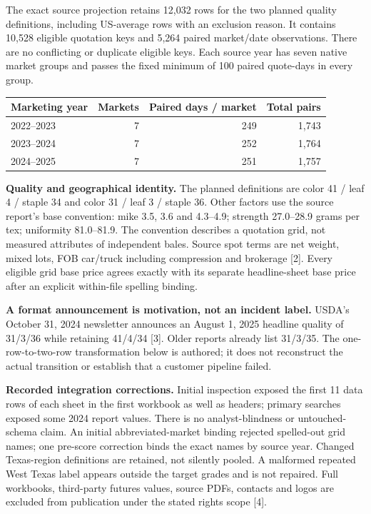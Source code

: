 \documentclass[10pt,letterpaper]{article}
\begin{document}
The exact source projection retains 12,032 rows for the two planned quality definitions, including US-average rows with an exclusion reason. It contains 10,528 eligible quotation keys and 5,264 paired market/date observations. There are no conflicting or duplicate eligible keys. Each source year has seven native market groups and passes the fixed minimum of 100 paired quote-days in every group.

\begin{center}\begin{tabular}{lrrr}\toprule
Marketing year & Markets & Paired days / market & Total pairs\\\midrule
2022--2023 & 7 & 249 & 1,743 \\
2023--2024 & 7 & 252 & 1,764 \\
2024--2025 & 7 & 251 & 1,757 \\
\bottomrule\end{tabular}\end{center}

\textbf{Quality and geographical identity.} The planned definitions are color 41 / leaf 4 / staple 34 and color 31 / leaf 3 / staple 36. Other factors use the source report's base convention: mike 3.5, 3.6 and 4.3--4.9; strength 27.0--28.9 grams per tex; uniformity 81.0--81.9. The convention describes a quotation grid, not measured attributes of independent bales. Source spot terms are net weight, mixed lots, FOB car/truck including compression and brokerage [2]. Every eligible grid base price agrees exactly with its separate headline-sheet base price after an explicit within-file spelling binding.

\textbf{A format announcement is motivation, not an incident label.} USDA's October 31, 2024 newsletter announces an August 1, 2025 headline quality of 31/3/36 while retaining 41/4/34 [3]. Older reports already list 31/3/35. The one-row-to-two-row transformation below is authored; it does not reconstruct the actual transition or establish that a customer pipeline failed.

\textbf{Recorded integration corrections.} Initial inspection exposed the first 11 data rows of each sheet in the first workbook as well as headers; primary searches exposed some 2024 report values. There is no analyst-blindness or untouched-schema claim. An initial abbreviated-market binding rejected spelled-out grid names; one pre-score correction binds the exact names by source year. Changed Texas-region definitions are retained, not silently pooled. A malformed repeated West Texas label appears outside the target grades and is not repaired. Full workbooks, third-party futures values, source PDFs, contacts and logos are excluded from publication under the stated rights scope [4].
\newpage
\end{document}

